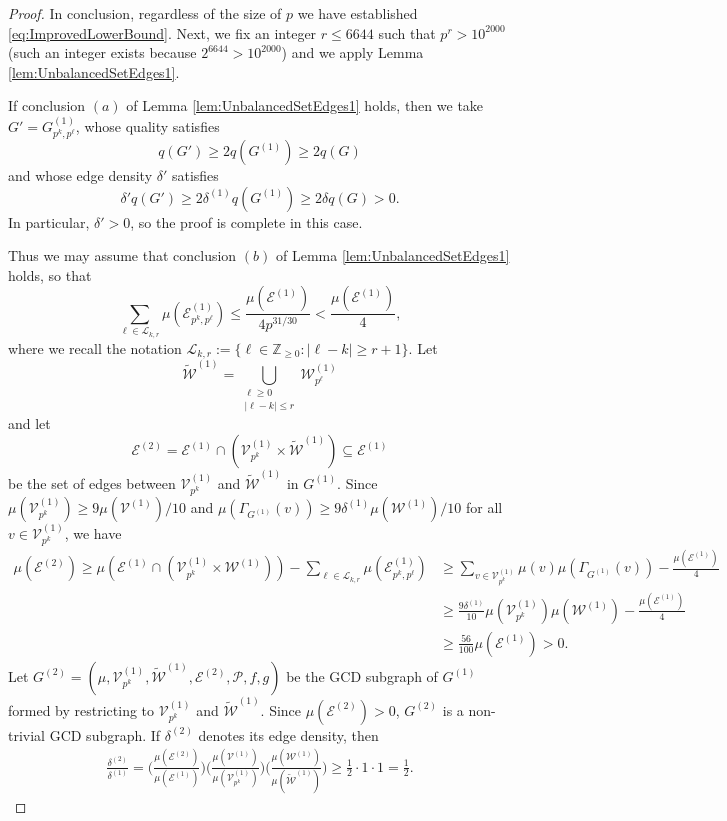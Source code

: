 \documentclass[12pt]{amsart}
\numberwithin{equation}{section}
\theoremstyle{definition}
\theoremstyle{remark}
\newcommand{\Z}{\mathbb{Z}}
\newcommand{\CE}{\mathcal{E}}
\newcommand{\CL}{\mathcal{L}}
\newcommand{\CP}{\mathcal{P}}
\newcommand{\CV}{\mathcal{V}}
\newcommand{\CW}{\mathcal{W}}
\renewcommand{\tilde}{\widetilde}
\renewcommand{\le}{\leqslant}
\renewcommand{\ge}{\geqslant}
\begin{document}
\begin{proof}
In conclusion, regardless of the size of $p$ we have established \eqref{eq:ImprovedLowerBound}. Next, we fix an integer $r\le 6644$ such that $p^r>10^{2000}$ (such an integer exists because $2^{6644}>10^{2000}$) and we apply Lemma \ref{lem:UnbalancedSetEdges1}.

If conclusion $(a)$ of Lemma \ref{lem:UnbalancedSetEdges1} holds, then we take $G'=G^{(1)}_{p^k,p^\ell}$, whose quality satisfies 
\[
q(G')\ge 2q(G^{(1)})\ge 2q(G)
\]
and whose edge density $\delta'$ satisfies 
\[
\delta'q(G')\ge2\delta^{(1)}q(G^{(1)})\ge2\delta q(G)>0.
\]
In particular, $\delta'>0$, so the proof is complete in this case.

Thus we may assume that conclusion $(b)$ of Lemma \ref{lem:UnbalancedSetEdges1} holds, so that
\[
\sum_{\ell\in\CL_{k,r}}  \mu(\CE^{(1)}_{p^k,p^\ell})\le\frac{\mu(\CE^{(1)})}{4p^{31/30}}<\frac{\mu(\CE^{(1)})}{4},
\]
where we recall the notation $\CL_{k,r}:=\{\ell\in\Z_{\ge0}:|\ell-k|\ge r+1\}$. Let 
\[
\tilde{\CW}^{(1)}=\bigcup_{\substack{\ell\ge0 \\ |\ell-k|\le r}}\CW^{(1)}_{p^\ell}
\]
and let
\[
\CE^{(2)}=\CE^{(1)}\cap(\CV^{(1)}_{p^k}\times\tilde{\CW}^{(1)})\subseteq\CE^{(1)}
\] 
be the set of edges between $\CV^{(1)}_{p^k}$ and $\tilde{\CW}^{(1)}$ in $G^{(1)}$. Since $\mu(\CV^{(1)}_{p^k})\ge 9\mu(\CV^{(1)})/10$ and $\mu(\Gamma_{G^{(1)}}(v))\ge 9\delta^{(1)}\mu(\CW^{(1)})/10$ for all $v\in \CV^{(1)}_{p^k}$, we have
\begin{align*}
\mu(\CE^{(2)})\ge \mu(\CE^{(1)}\cap(\CV_{p^k}^{(1)}\times\CW^{(1)}) ) -\sum_{\ell\in\CL_{k,r}}  \mu(\CE^{(1)}_{p^k,p^\ell})
&\ge \sum_{v\in \CV^{(1)}_{p^k}}\mu(v)\mu(\Gamma_{G^{(1)}}(v))-\frac{\mu(\CE^{(1)})}{4}\\
&\ge \frac{9 \delta^{(1)}}{10}\mu(\CV^{(1)}_{p^k})\mu(\CW^{(1)})-\frac{\mu(\CE^{(1)})}{4}\\
&\ge \frac{56}{100}\mu(\CE^{(1)})>0. 
\end{align*}
Let $G^{(2)}=(\mu,\CV^{(1)}_{p^k},\tilde{\CW}^{(1)},\CE^{(2)},\CP,f,g)$ be the GCD subgraph of $G^{(1)}$ formed by restricting to $\CV^{(1)}_{p^k}$ and $\tilde{\CW}^{(1)}$. Since $\mu(\CE^{(2)})>0$, $G^{(2)}$ is a non-trivial GCD subgraph. If $\delta^{(2)}$ denotes its edge density, then
\begin{align*}
\frac{\delta^{(2)}}{\delta^{(1)}}= 
\bigg(\frac{\mu(\CE^{(2)})}{\mu(\CE^{(1)})}\bigg)
	 \bigg(\frac{\mu(\CV^{(1)})}{\mu(\CV_{p^k}^{(1)})}\bigg)
	\bigg( \frac{\mu(\CW^{(1)})}{\mu(\tilde{\CW}^{(1)})}\bigg)
	\ge\frac{1}{2}\cdot 1\cdot 1=\frac{1}{2}.
\end{align*}

\end{proof}
\end{document}
